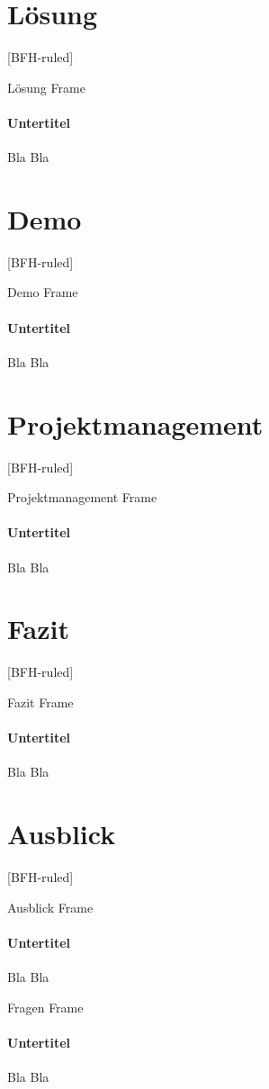 \documentclass[
	ngerman,%
	authorontitle=true,
	]{bfhbeamer}
\begin{document}
\section{Lösung}\label{sec:loesung}
[BFH-ruled]
\frame{\sectionpage}

\begin{frame}{Lösung Frame}
	\framesubtitle{Untertitel}
	Bla Bla
\end{frame}

\section{Demo}\label{sec:demo}
[BFH-ruled]
\frame{\sectionpage}

\begin{frame}{Demo Frame}
	\framesubtitle{Untertitel}
	Bla Bla
\end{frame}

\section{Projektmanagement}\label{sec:projektmanagement}
[BFH-ruled]
\frame{\sectionpage}

\begin{frame}{Projektmanagement Frame}
	\framesubtitle{Untertitel}
	Bla Bla
\end{frame}

\section{Fazit}\label{sec:fazit}
[BFH-ruled]
\frame{\sectionpage}

\begin{frame}{Fazit Frame}
	\framesubtitle{Untertitel}
	Bla Bla
\end{frame}

\section{Ausblick}\label{sec:ausblick}
[BFH-ruled]
\frame{\sectionpage}

\begin{frame}{Ausblick Frame}
	\framesubtitle{Untertitel}
	Bla Bla
\end{frame}

\begin{frame}{Fragen Frame}
	\framesubtitle{Untertitel}
	Bla Bla
\end{frame}
\end{document}
